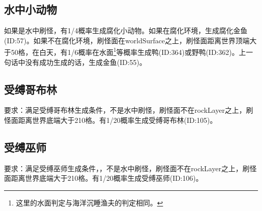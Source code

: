 \subsection{水中小动物}
如果是水中刷怪，有1/4概率生成腐化小动物。如果在腐化环境，生成腐化金鱼(ID:57)。如果不在腐化环境，刷怪面在worldSurface之上，刷怪面距离世界顶端大于50格，在白天，有1/6概率在水面\footnote{这里的水面判定与海洋沉睡渔夫的判定相同。}等概率生成鸭(ID:364)或野鸭(ID:362)。上一句话中没有成功生成的话，生成金鱼(ID:55)。

\subsection{受缚哥布林}
要求：满足受缚哥布林生成条件，不是水中刷怪，刷怪面不在rockLayer之上，刷怪面距离世界底端大于210格。有1/20概率生成受缚哥布林(ID:105)。

\subsection{受缚巫师}
要求：满足受缚巫师生成条件，，不是水中刷怪，刷怪面不在rockLayer之上，刷怪面距离世界底端大于210格。有1/20概率生成受缚巫师(ID:106)。


